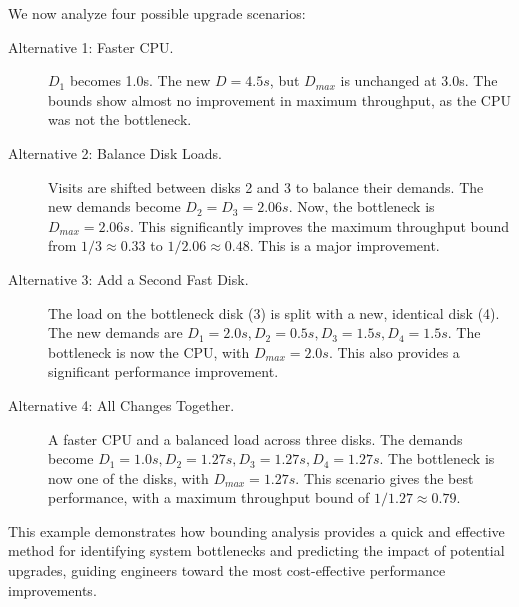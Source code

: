 We now analyze four possible upgrade scenarios:
\begin{description}
    \item[Alternative 1: Faster CPU.] $D_1$ becomes 1.0s. The new $D=4.5s$, but $D_{max}$ is unchanged at 3.0s. The bounds show almost no improvement in maximum throughput, as the CPU was not the bottleneck.
    \item[Alternative 2: Balance Disk Loads.] Visits are shifted between disks 2 and 3 to balance their demands. The new demands become $D_2=D_3=2.06s$. Now, the bottleneck is $D_{max}=2.06s$. This significantly improves the maximum throughput bound from $1/3 \approx 0.33$ to $1/2.06 \approx 0.48$. This is a major improvement.
    \item[Alternative 3: Add a Second Fast Disk.] The load on the bottleneck disk (3) is split with a new, identical disk (4). The new demands are $D_1=2.0s, D_2=0.5s, D_3=1.5s, D_4=1.5s$. The bottleneck is now the CPU, with $D_{max}=2.0s$. This also provides a significant performance improvement.
    \item[Alternative 4: All Changes Together.] A faster CPU and a balanced load across three disks. The demands become $D_1=1.0s, D_2=1.27s, D_3=1.27s, D_4=1.27s$. The bottleneck is now one of the disks, with $D_{max}=1.27s$. This scenario gives the best performance, with a maximum throughput bound of $1/1.27 \approx 0.79$.
\end{description}


This example demonstrates how bounding analysis provides a quick and effective method for identifying system bottlenecks and predicting the impact of potential upgrades, guiding engineers toward the most cost-effective performance improvements.